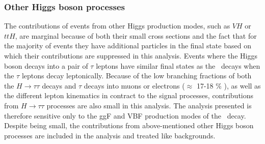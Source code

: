 \subsubsection{Other Higgs boson processes}
The contributions of \HWW events from other Higgs production modes, such as $VH$ or $ttH$, are marginal because of both their small cross sections and the fact that for the majority of events they have additional particles in the final state based on which their contributions are suppressed in this analysis.
Events where the Higgs boson decays into a pair of $\tau$ leptons have similar final states as the \HWWdet\ decays when the $\tau$ leptons decay leptonically. 
Because of the low branching fractions of both the $H \to \tau\tau$ decays and $\tau$ decays into muons or electrons ($\approx$ 17-18 \% \cite{PDG2020}), as well as the different lepton kinematics in contract to the signal processes, contributions from $H \to \tau\tau$ processes are also small in this analysis. 
The analysis presented is therefore sensitive only to the ggF and VBF production modes of the \HWWdet\ decay. 
Despite being small, the contributions from above-mentioned other Higgs boson processes are included in the analysis and treated like backgrounds.

